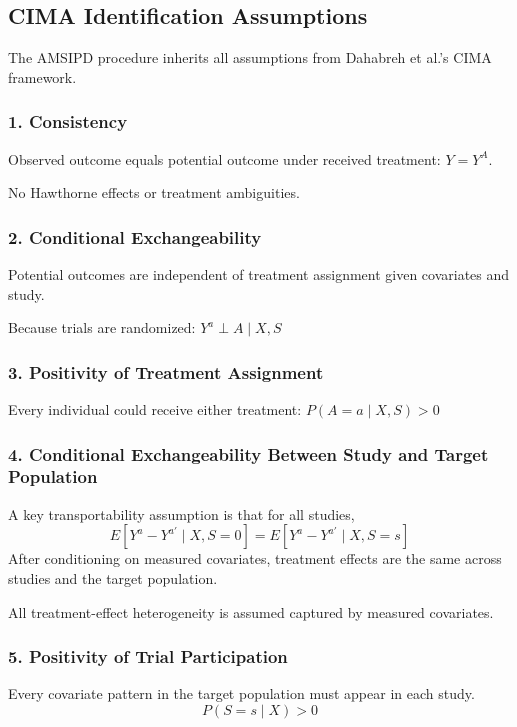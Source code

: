 \documentclass[11pt]{article}
\begin{document}
\subsection*{CIMA Identification Assumptions}

The AMSIPD procedure inherits all assumptions from Dahabreh et al.'s CIMA framework.

\subsubsection*{1. Consistency}

Observed outcome equals potential outcome under received treatment: $Y = Y^A$. 

No Hawthorne effects or treatment ambiguities.

\subsubsection*{2. Conditional Exchangeability}

Potential outcomes are independent of treatment assignment given covariates and study.

Because trials are randomized: $ Y^a \perp A \mid X,S$

\subsubsection*{3. Positivity of Treatment Assignment}

Every individual could receive either treatment: $P(A=a \mid X,S)>0$

\subsubsection*{4. Conditional Exchangeability Between Study and Target Population}

A key transportability assumption is that for all studies,\[E[Y^a-Y^{a'} \mid X,S=0]=E[Y^a-Y^{a'} \mid X,S=s]\]
After conditioning on measured covariates, treatment effects are the same across studies and the target population.

All treatment-effect heterogeneity is assumed captured by measured covariates.

\subsubsection*{5. Positivity of Trial Participation}

Every covariate pattern in the target population must appear in each study.\[P(S=s \mid X)>0\]
\end{document}
